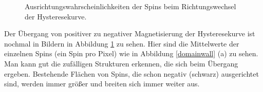 \begin{figure}[h]
  \hfill
  \hfill
  \hfill
  \hfill
\caption{Ausrichtungswahrscheinlichkeiten der Spins beim Richtungswechsel der Hysteresekurve.\label{hysterese-wechsel}}
\end{figure}

Der Übergang von positiver zu negativer Magnetisierung der Hysteresekurve ist nochmal in Bildern in Abbildung \ref{hysterese-wechsel} zu sehen.
Hier sind die Mittelwerte der einzelnen Spins (ein Spin pro Pixel) wie in Abbildung \ref{domainwall} (a) zu sehen.
Man kann gut die zufälligen Strukturen erkennen, die sich beim Übergang ergeben.
Bestehende Flächen von Spins, die schon negativ (schwarz) ausgerichtet sind, werden immer größer und breiten sich immer weiter aus.


